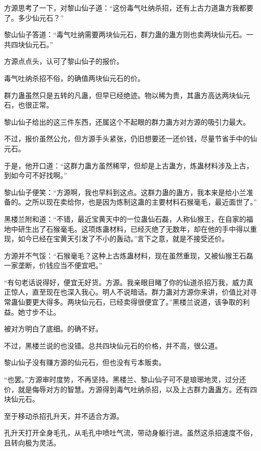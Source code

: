 
\begin{this_body}



方源思考了一下，对黎山仙子道：“这份毒气吐纳杀招，还有上古力道蛊方我都要了。多少仙元石？”

黎山仙子答道：“毒气吐纳需要两块仙元石，群力蛊的蛊方则也卖两块仙元石。一共四块仙元石。”

方源点点头，认可了黎山仙子的报价。

毒气吐纳杀招不俗，的确值两块仙元石的价。

群力蛊虽然只是五转的凡蛊，但早已经绝迹。物以稀为贵，其蛊方高达两块仙元石，也很正常。

黎山仙子给出的这三件东西，还属这个不起眼的群力蛊方对方源的吸引力最大。

不过，报价虽然公允，但方源手头紧张，仍旧想要还一还价钱，尽量节省手中的仙元石。

于是，他开口道：“这群力蛊方虽然稀罕，但却是上古蛊方，炼蛊材料涉及上古，到如今可不好找啊。”

黎山仙子便笑：“方源啊，我也早料到这点。这群力蛊的蛊方，我本来是给小兰准备的。之所以现在卖给你，也是因为炼制这蛊的主要材料石猴毫毛，最近面世了。”

黑楼兰附和道：“不错，最近宝黄天中的一位蛊仙石磊，人称仙猴王，在自家的福地中研生出了石猴毫毛。这项炼蛊材料，已经灭绝了无数年，却在他的手中得以重现，如今已经在宝黄天引发了不小的轰动。”言下之意，就是不接受还价。

方源并不气馁：“石猴毫毛？这种上古炼蛊材料，现在虽然重现，又被仙猴王石磊一家垄断，价钱应当不便宜吧。”

“有句老话说得好，便宜无好货。方源。我亲眼目睹了你的仙道杀招万我，威力真正惊人，直至现在也深入我心。明人不说暗话。群力蛊对方源你来讲，价值比对寻常蛊仙要更大得多。两块仙元石，已经卖得很便宜了。”黑楼兰说道，该争取的利益。她寸步不让。

被对方明白了底细。的确不好。

不过，黑楼兰说的也没错。总共四块仙元石的价格，并不高，很公道。

黎山仙子没有赚方源的仙元石，但也没有亏本贩卖。

“也罢。”方源审时度势，不再坚持。黑楼兰、黎山仙子可不是琅琊地灵，过分还价，就是侮辱对方的智慧。方源得到毒气吐纳杀招，以及上古群力蛊蛊方。还有四块仙元石。

至于移动杀招孔升天，并不适合方源。

孔升天打开全身毛孔，从毛孔中喷吐气流，带动身躯行进。虽然这杀招速度不俗，且转向极为灵活。


\end{this_body}
